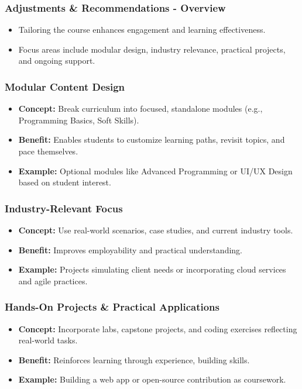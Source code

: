 \documentclass{beamer}
\begin{document}
\begin{frame}[fragile]
  \frametitle{Adjustments & Recommendations - Overview}
  \begin{itemize}
    \item Tailoring the course enhances engagement and learning effectiveness.
    \item Focus areas include modular design, industry relevance, practical projects, and ongoing support.
  \end{itemize}
\end{frame}

\begin{frame}[fragile]
  \frametitle{Modular Content Design}
  \begin{itemize}
    \item \textbf{Concept:} Break curriculum into focused, standalone modules (e.g., Programming Basics, Soft Skills).
    \item \textbf{Benefit:} Enables students to customize learning paths, revisit topics, and pace themselves.
    \item \textbf{Example:} Optional modules like Advanced Programming or UI/UX Design based on student interest.
  \end{itemize}
\end{frame}

\begin{frame}[fragile]
  \frametitle{Industry-Relevant Focus}
  \begin{itemize}
    \item \textbf{Concept:} Use real-world scenarios, case studies, and current industry tools.
    \item \textbf{Benefit:} Improves employability and practical understanding.
    \item \textbf{Example:} Projects simulating client needs or incorporating cloud services and agile practices.
  \end{itemize}
\end{frame}

\begin{frame}[fragile]
  \frametitle{Hands-On Projects \& Practical Applications}
  \begin{itemize}
    \item \textbf{Concept:} Incorporate labs, capstone projects, and coding exercises reflecting real-world tasks.
    \item \textbf{Benefit:} Reinforces learning through experience, building skills.
    \item \textbf{Example:} Building a web app or open-source contribution as coursework.
  \end{itemize}
\end{frame}
\end{document}
